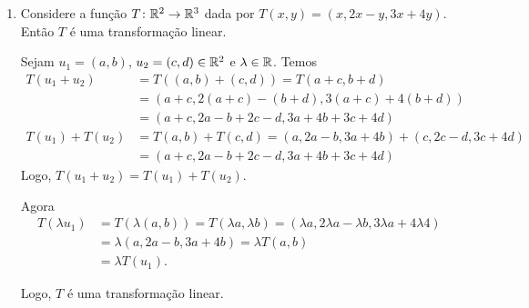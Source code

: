 \begin{exemplo}
\begin{enumerate}[label={\arabic*})]
    \item Considere a função $T \colon \mathbb{R}^2 \to \mathbb{R}^3$ dada por $T(x, y) = (x, 2x - y, 3x + 4y)$. Então $T$ é uma transformação linear.
    \begin{solucao}
        Sejam $u_1 = (a, b)$, $u_2 = (c, d) \in \mathbb{R}^2$ e $\lambda \in \mathbb{R}$. Temos
        \begin{align*}
            T(u_1 + u_ 2) &= T((a, b) + (c, d)) = T(a + c, b + d) \\ &= (a + c, 2(a + c) - (b + d), 3(a + c) + 4(b + d)) \\ &= (a + c, 2a - b + 2c - d, 3a + 4b + 3c + 4d)\\
            T(u_1) + T(u_2) &= T(a, b) + T(c, d) = (a, 2a - b, 3a + 4b) + (c, 2c - d, 3c + 4d) \\ &= (a + c, 2a - b + 2c - d, 3a + 4b + 3c + 4d)
        \end{align*}
        Logo, $T(u_1 + u_2) = T(u_1) + T(u_2)$.

        Agora
        \begin{align*}
            T(\lambda u_1) &= T(\lambda (a, b)) = T(\lambda a, \lambda b) = (\lambda a, 2\lambda a - \lambda b, 3\lambda a + 4\lambda 4) \\ &= \lambda (a, 2a - b, 3a + 4b) = \lambda T(a, b) \\ &= \lambda T(u_1).
        \end{align*}

        Logo, $T$ é uma transformação linear.
    \end{solucao}


\end{enumerate}
\end{exemplo}
